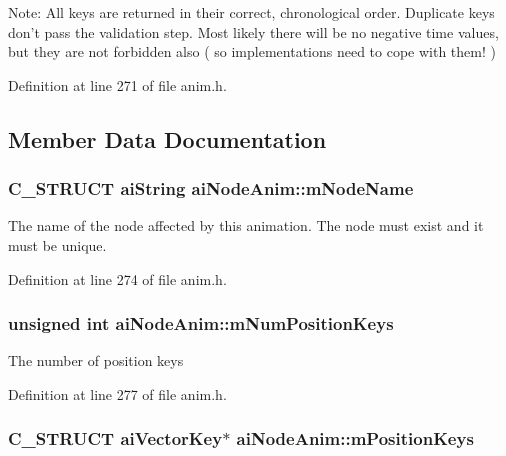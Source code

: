 \begin{Desc}
\item[Note:]All keys are returned in their correct, chronological order. Duplicate keys don't pass the validation step. Most likely there will be no negative time values, but they are not forbidden also ( so implementations need to cope with them! ) \end{Desc}


Definition at line 271 of file anim.h.

\subsection{Member Data Documentation}
\hypertarget{structai_node_anim_22a591381e75214ba03c6aaa770638f3}{
\subsubsection[mNodeName]{\setlength{\rightskip}{0pt plus 5cm}C\_\-STRUCT {\bf aiString} {\bf aiNodeAnim::mNodeName}}}
\label{structai_node_anim_22a591381e75214ba03c6aaa770638f3}


The name of the node affected by this animation. The node must exist and it must be unique. 

Definition at line 274 of file anim.h.\hypertarget{structai_node_anim_ab725313d31db70adab778a3c125103f}{
\subsubsection[mNumPositionKeys]{\setlength{\rightskip}{0pt plus 5cm}unsigned int {\bf aiNodeAnim::mNumPositionKeys}}}
\label{structai_node_anim_ab725313d31db70adab778a3c125103f}


The number of position keys 

Definition at line 277 of file anim.h.\hypertarget{structai_node_anim_983d0db426ac7e5fce442beb19552db3}{
\subsubsection[mPositionKeys]{\setlength{\rightskip}{0pt plus 5cm}C\_\-STRUCT {\bf aiVectorKey}$\ast$ {\bf aiNodeAnim::mPositionKeys}}}
\label{structai_node_anim_983d0db426ac7e5fce442beb19552db3}


